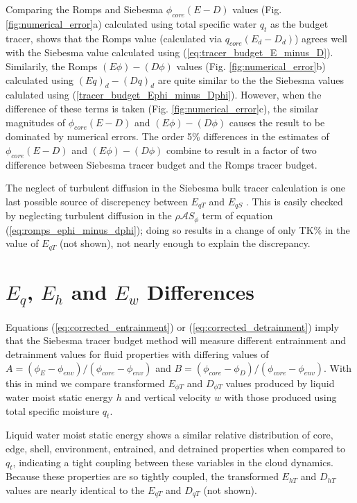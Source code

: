 \documentclass[12pt]{article}
\begin{document}
Comparing the Romps and Siebesma $\phi_{core}(E - D)$ values
(Fig. \ref{fig:numerical_error}a) calculated using total specific water
$q_t$ as the budget tracer, shows that the Romps value (calculated via 
$q_{core}(E_d - D_d)$) agrees well with the Siebesma value calculated 
using (\ref{eq:tracer_budget_E_minus_D}).  Similarily, the Romps 
$(E\phi) - (D\phi)$ values (Fig. \ref{fig:numerical_error}b) calculated 
using $(Eq)_d - (Dq)_d$ are quite similar to the the Siebesma values 
calulated using (\ref{tracer_budget_Ephi_minus_Dphi}).  However, when 
the difference of these terms is taken 
(Fig. \ref{fig:numerical_error}c), the similar magnitudes of 
$\phi_{core}(E - D)$ and $(E\phi) - (D\phi)$ causes the result to 
be dominated by numerical errors.  The order 5\% differences in the 
estimates of $\phi_{core}(E - D)$ and  $(E\phi) - (D\phi)$ combine to 
result in a factor of two difference between Siebesma tracer budget and 
the Romps tracer budget.

The neglect of turbulent diffusion in the Siebesma bulk tracer 
calculation is one last possible source of discrepency between $E_{q T}$ 
and $E_{q S}$ .  This is easily checked by neglecting turbulent diffusion
in the $\rho \mathcal{A}S_\phi$ term of equation 
(\ref{eq:romps_ephi_minus_dphi}); doing so results in a change of 
only TK\% in the value of $E_{q T}$ (not shown), not nearly enough 
to explain the discrepancy.


\section{$E_q$, $E_h$ and $E_w$ Differences}

Equations (\ref{eq:corrected_entrainment}) or (\ref{eq:corrected_detrainment}) 
imply that the Siebesma tracer budget method will measure different entrainment
and detrainment values for fluid properties with differing values of 
$A = (\phi_E - \phi_{env})/(\phi_{core} - \phi_{env})$ and
$B = (\phi_{core} - \phi_D)/(\phi_{core} - \phi_{env})$.  With this in mind we 
compare transformed $E_{\phi T}$ and $D_{\phi T}$ values produced by liquid 
water moist static energy $h$ and vertical velocity $w$ with those produced 
using total specific moisture $q_t$.

Liquid water moist static energy shows a similar relative distribution of 
core, edge, shell, environment, entrained, and detrained properties when 
compared to $q_t$, indicating a tight coupling between these variables in 
the cloud dynamics.  Because these properties are so tightly coupled, the
transformed $E_{hT}$ and $D_{hT}$ values are nearly identical to the $E_{qT}$ 
and $D_{qT}$ (not shown).
\end{document}
